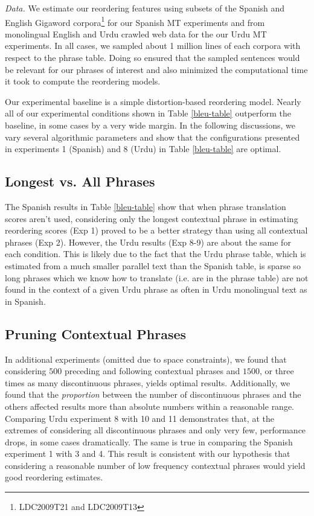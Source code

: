 \documentclass[11pt,letterpaper]{article}
\newcommand{\todo}[1]{\textcolor{red}{TODO: #1}}
\newcommand{\paraheader}[1]{\vskip 0.05in \noindent\emph{#1}}
\begin{document}
\paraheader{Data.} We estimate our reordering features using subsets of the Spanish and English Gigaword corpora\footnote{LDC2009T21 and LDC2009T13} for our Spanish MT experiments and from monolingual English and Urdu crawled web data for the our Urdu MT experiments. In all cases, we sampled about 1 million lines of each corpora with respect to the phrase table. Doing so ensured that the sampled sentences would be relevant for our phrases of interest and also minimized the computational time it took to compute the reordering models.


Our experimental baseline is a simple distortion-based reordering model. Nearly all of our experimental conditions shown in Table \ref{bleu-table} outperform the baseline, in some cases by a very wide margin. In the following discussions, we vary several algorithmic parameters and show that the configurations presented in experiments 1 (Spanish) and 8 (Urdu) in Table \ref{bleu-table} are optimal. 

\subsection{Longest vs. All Phrases}
The Spanish results in Table \ref{bleu-table} show that when phrase translation scores aren't used, considering only the longest contextual phrase in estimating reordering scores (Exp 1) proved to be a better strategy than using all contextual phrases (Exp 2). However, the Urdu results (Exp 8-9) are about the same for each condition. This is likely due to the fact that the Urdu phrase table, which is estimated from a much smaller parallel text than the Spanish table, is sparse so long phrases which we know how to translate (i.e. are in the phrase table) are not found in the context of a given Urdu phrase as often in Urdu monolingual text as in Spanish. 

\subsection{Pruning Contextual Phrases}
In additional experiments (omitted due to space constraints), we found that considering $500$ preceding and following contextual phrases and $1500$, or three times as many discontinuous phrases, yields optimal results. Additionally, we found that the {\it proportion} between the number of discontinuous phrases and the others affected results more than absolute numbers within a reasonable range. Comparing Urdu experiment 8 with 10 and 11 demonstrates that, at the extremes of considering all discontinuous phrases and only very few, performance drops, in some cases dramatically. The same is true in comparing the Spanish experiment 1 with 3 and 4. This result is consistent with our hypothesis that considering a reasonable number of low frequency contextual phrases would yield good reordering estimates.
\end{document}
